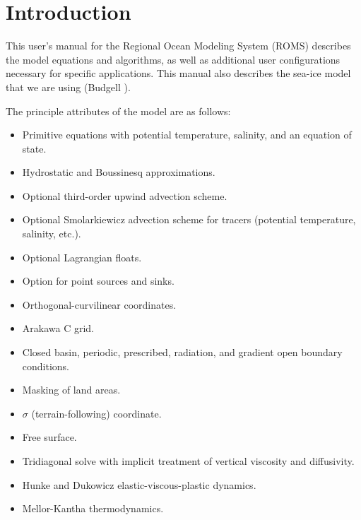 \setcounter{page}{1}
\section{Introduction}
This user's manual for the Regional Ocean Modeling System (ROMS)
describes the model equations and algorithms, as well as
additional user configurations necessary for specific applications.
This manual also describes the sea-ice model
that we are using (Budgell \cite{Budgell05}).

The principle attributes of the model are as follows:
\begin{klist}
 \mbox{}
\begin{itemize}
  \item Primitive equations with potential temperature, salinity, and an
equation of state.
  \item Hydrostatic and Boussinesq approximations.
  \item Optional third-order upwind advection scheme.
  \item Optional Smolarkiewicz advection scheme for tracers
    (potential temperature, salinity, etc.).
  \item Optional Lagrangian floats.
  \item Option for point sources and sinks.
\end {itemize}
 \mbox{}
\begin{itemize}
  \item Orthogonal-curvilinear coordinates.
  \item Arakawa C grid.
  \item Closed basin, periodic, prescribed, radiation, and
    gradient open boundary conditions.
  \item Masking of land areas.
\end {itemize}
 \mbox{}
\begin{itemize}
  \item $\sigma$ (terrain-following) coordinate.
  \item Free surface.
  \item Tridiagonal solve with implicit treatment of vertical
    viscosity and diffusivity.
\end {itemize}
 \mbox{}
\begin{itemize}
  \item Hunke and Dukowicz elastic-viscous-plastic dynamics.
  \item Mellor-Kantha thermodynamics.

\end{itemize}
\end{klist}
